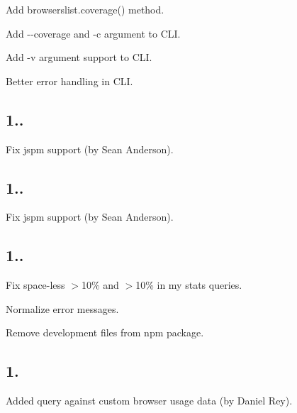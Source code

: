 \begin{DoxyItemize}
\item Add {\ttfamily browserslist.\+coverage()} method.
\item Add {\ttfamily -\/-\/coverage} and {\ttfamily -\/c} argument to C\+LI.
\item Add {\ttfamily -\/v} argument support to C\+LI.
\item Better error handling in C\+LI.
\end{DoxyItemize}

\subsection*{1..}


\begin{DoxyItemize}
\item Fix jspm support (by Sean Anderson).
\end{DoxyItemize}

\subsection*{1..}


\begin{DoxyItemize}
\item Fix jspm support (by Sean Anderson).
\end{DoxyItemize}

\subsection*{1..}


\begin{DoxyItemize}
\item Fix space-\/less {\ttfamily $>$10\%} and {\ttfamily $>$10\% in my stats} queries.
\item Normalize error messages.
\item Remove development files from npm package.
\end{DoxyItemize}

\subsection*{1.}


\begin{DoxyItemize}
\item Added query against custom browser usage data (by Daniel Rey).
\end{DoxyItemize}

